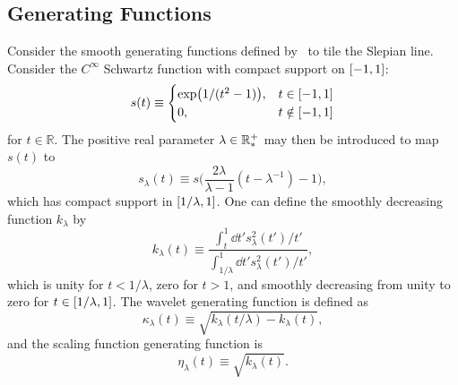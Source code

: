 \subsection{Generating Functions}\label{sec:chapter4_generating_functions}

Consider the smooth generating functions defined by~\cite{Wiaux2008} to tile the Slepian line.
Consider the \(C^{\infty}\) Schwartz function with compact support on \(\interval{-1}{1}\):
%
\begin{equation}
	s(t) \equiv
	\begin{cases}
		\exp(1/(t^{2}-1)), & t \in \interval{-1}{1}    \\
		0,                 & t \notin \interval{-1}{1}
	\end{cases}
\end{equation}
%
for \(t \in \mathbb{R}\).
The positive real parameter \(\lambda \in \mathbb{R}_{\ast}^{+}{}\) may then be introduced to map \(s(t)\) to
%
\begin{equation}
	s_{\lambda}(t)
	\equiv s\bigg(\frac{2\lambda}{\lambda-1}(t-\lambda^{-1}) - 1\bigg),
\end{equation}
%
which has compact support in \(\interval{1/\lambda}{1}\).
One can define the smoothly decreasing function \(k_{\lambda}\) by
%
\begin{equation}
	k_{\lambda}(t)
	\equiv \frac{\int_{t}^{1} \dd{t'} s^{2}_{\lambda}(t')/t'}
	{\int_{1/\lambda}^{1} \dd{t'} s^{2}_{\lambda}(t')/t'},
\end{equation}
%
which is unity for \(t < 1/\lambda{}\), zero for \(t > 1\), and smoothly decreasing from unity to zero for \(t \in \interval{1/\lambda}{1}\).
The wavelet generating function is defined as
%
\begin{equation}
	\kappa_{\lambda}(t)
	\equiv \sqrt{k_{\lambda}(t/\lambda) - k_{\lambda}(t)},
\end{equation}
%
and the scaling function generating function is
%
\begin{equation}
	\eta_{\lambda}(t)
	\equiv \sqrt{k_{\lambda}(t)}.
\end{equation}


